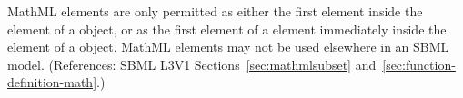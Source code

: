 MathML  elements are only permitted as either the first
element inside the  element of a \FunctionDefinition object, or
as the first element of a  element immediately inside the
 element of a \FunctionDefinition object.  MathML
 elements may not be used elsewhere in an SBML model.
(References: SBML L3V1 Sections~\ref{sec:mathmlsubset}
and~\ref{sec:function-definition-math}.)

